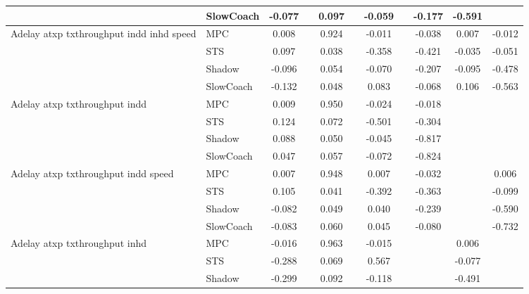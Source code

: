 \begin{tabular}{|l|l|*{9}{c|}}
                              & SlowCoach &   -0.077 &        &     0.097 &     & -0.059 &     &  -0.177 &  -0.591 &       \\
\midrule
Adelay atxp txthroughput indd inhd speed    & MPC &    0.008 &        &     0.924 &     & -0.011 &     &  -0.038 &   0.007 &   -0.012 \\
                              & STS &    0.097 &        &     0.038 &     & -0.358 &     &  -0.421 &  -0.035 &   -0.051 \\
                              & Shadow &   -0.096 &        &     0.054 &     & -0.070 &     &  -0.207 &  -0.095 &   -0.478 \\
                              & SlowCoach &   -0.132 &        &     0.048 &     &  0.083 &     &  -0.068 &   0.106 &   -0.563 \\
\midrule
Adelay atxp txthroughput indd    & MPC &    0.009 &        &     0.950 &     & -0.024 &     &  -0.018 &      &       \\
                              & STS &    0.124 &        &     0.072 &     & -0.501 &     &  -0.304 &      &       \\
                              & Shadow &    0.088 &        &     0.050 &     & -0.045 &     &  -0.817 &      &       \\
                              & SlowCoach &    0.047 &        &     0.057 &     & -0.072 &     &  -0.824 &      &       \\
\midrule
Adelay atxp txthroughput indd speed    & MPC &    0.007 &        &     0.948 &     &  0.007 &     &  -0.032 &      &    0.006 \\
                              & STS &    0.105 &        &     0.041 &     & -0.392 &     &  -0.363 &      &   -0.099 \\
                              & Shadow &   -0.082 &        &     0.049 &     &  0.040 &     &  -0.239 &      &   -0.590 \\
                              & SlowCoach &   -0.083 &        &     0.060 &     &  0.045 &     &  -0.080 &      &   -0.732 \\
\midrule
Adelay atxp txthroughput inhd    & MPC &   -0.016 &        &     0.963 &     & -0.015 &     &      &   0.006 &       \\
                              & STS &   -0.288 &        &     0.069 &     &  0.567 &     &      &  -0.077 &       \\
                              & Shadow &   -0.299 &        &     0.092 &     & -0.118 &     &      &  -0.491 &       \\

\end{tabular}
